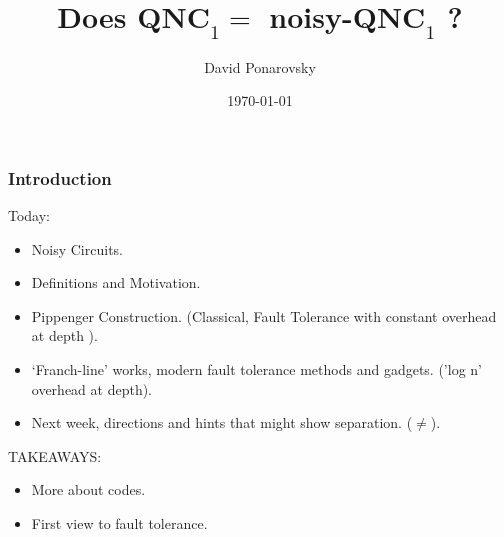 \documentclass{beamer}
\newcommand*{\QNCon}{ \mathbf{QNC}_{1} }
\newcommand*{\noiseQNCon}{ noisy-$\QNCon$ }
\begin{document}
 

\newcommand*{\Tr}{\textbf{Tr }}


\begin{frame}
  \title{Does $\QNCon =$ \noiseQNCon ? }
    \author{David Ponarovsky}
    \date{\today}
    \titlepage
\end{frame}


\begin{frame}

\frametitle{Introduction}
\begin{block}{Today:}
\begin{itemize}
  \item Noisy Circuits.
  \item  Definitions and Motivation.
  \item  Pippenger Construction. (Classical, Fault Tolerance with constant overhead at depth ).
  \item `Franch-line' works, modern fault tolerance methods and gadgets. ('log n' overhead at depth).  
  \item Next week, directions and hints that might show separation. ($\neq$).
\end{itemize}
\end{block}
\begin{block}{TAKEAWAYS:}
\begin{itemize}
  \item More about codes.
  \item  First view to fault tolerance.  
\end{itemize}
\end{block}
\end{frame}
\end{document}
